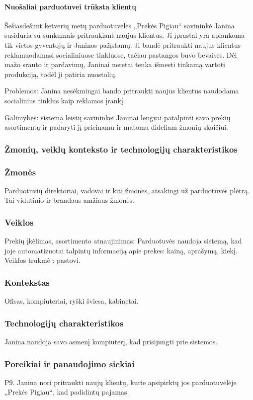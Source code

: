 \documentclass{article}
\begin{document}
\paragraph{Nuošaliai parduotuvei trūksta klientų}
	Šešiasdešimt ketverių metų parduotuvėlės „Prekės Pigiau“ savininkė Janina susiduria su sunkumais pritraukiant naujus klientus. Ji įprastai yra aplankoma tik vietos gyventojų ir Janinos pažįstamų. Ji bandė pritraukti naujus klientus reklamuodamasi socialiniuose tinkluose, tačiau pastangos buvo bevaisės. Dėl mažo srauto ir pardavimų, Janinai neretai tenka išmesti tinkamą vartoti produkciją, todėl ji patiria nuostolių. \par
Problemos: Janina nesėkmingai bando pritraukti naujus klientus naudodama socialinius tinklus kaip reklamos įrankį.\par
Galimybės: sistema leistų savininkei Janinai lengvai patalpinti savo prekių asortimentą ir padaryti jį prieinamu ir matomu dideliam žmonių skaičiui.
\subsubsection{Žmonių, veiklų konteksto ir technologijų charakteristikos}
\subsubsection*{Žmonės}
	Parduotuvių direktoriai, vadovai ir kiti žmonės, atsakingi už parduotuvės plėtrą.
	Tai vidutinio ir brandaus amžiaus žmonės.
\subsubsection*{Veiklos}
	Prekių įkėlimas, asortimento atnaujinimas:
	Parduotuvės naudoja sistemą, kad joje automatizuotai talpintų informaciją apie prekes: kainą, aprašymą, kiekį. Veiklos trukmė : pastovi.
\subsubsection*{Kontekstas}
	Ofisas, kompiuteriai, ryški šviesa, kabinetai.
\subsubsection*{Technologijų charakteristikos}
	Janina naudoja savo asmenį kompiuterį, kad prisijungti prie sistemos.
\subsubsection{Poreikiai ir panaudojimo siekiai}
	P9. Janina nori pritraukti naujų klientų, kurie apsipirktų jos parduotuvėlėje „Prekės Pigiau“, kad padidintų pajamas.
	\pagebreak
	
\end{document}
